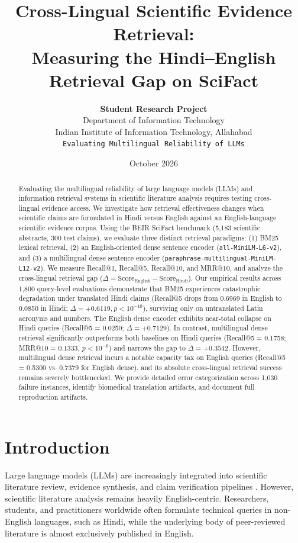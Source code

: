 \documentclass[11pt,a4paper]{article}
\title{\textbf{Cross-Lingual Scientific Evidence Retrieval:\\Measuring the Hindi--English Retrieval Gap on SciFact}}
\author{
  \textbf{Student Research Project} \\
  Department of Information Technology \\
  Indian Institute of Information Technology, Allahabad \\
  \texttt{Evaluating Multilingual Reliability of LLMs}
}
\date{October 2026}
\begin{document}
\maketitle

\begin{abstract}
Evaluating the multilingual reliability of large language models (LLMs) and information retrieval systems in scientific literature analysis requires testing cross-lingual evidence access. We investigate how retrieval effectiveness changes when scientific claims are formulated in Hindi versus English against an English-language scientific evidence corpus. Using the BEIR SciFact benchmark (5,183 scientific abstracts, 300 test claims), we evaluate three distinct retrieval paradigms: (1) BM25 lexical retrieval, (2) an English-oriented dense sentence encoder (\texttt{all-MiniLM-L6-v2}), and (3) a multilingual dense sentence encoder (\texttt{paraphrase-multilingual-MiniLM-L12-v2}). We measure Recall@1, Recall@5, Recall@10, and MRR@10, and analyze the cross-lingual retrieval gap ($\Delta = \text{Score}_{\text{English}} - \text{Score}_{\text{Hindi}}$). Our empirical results across 1,800 query-level evaluations demonstrate that BM25 experiences catastrophic degradation under translated Hindi claims (Recall@5 drops from 0.6969 in English to 0.0850 in Hindi; $\Delta = +0.6119, p < 10^{-10}$), surviving only on untranslated Latin acronyms and numbers. The English dense encoder exhibits near-total collapse on Hindi queries (Recall@5 = 0.0250; $\Delta = +0.7129$). In contrast, multilingual dense retrieval significantly outperforms both baselines on Hindi queries (Recall@5 = 0.1758; MRR@10 = 0.1333, $p < 10^{-6}$) and narrows the gap to $\Delta = +0.3542$. However, multilingual dense retrieval incurs a notable capacity tax on English queries (Recall@5 = 0.5300 vs. 0.7379 for English dense), and its absolute cross-lingual retrieval success remains severely bottlenecked. We provide detailed error categorization across 1,030 failure instances, identify biomedical translation artifacts, and document full reproduction artifacts.
\end{abstract}

\section{Introduction}
Large language models (LLMs) are increasingly integrated into scientific literature review, evidence synthesis, and claim verification pipelines \cite{wadden2020fact,thakur2021beir}. However, scientific literature analysis remains heavily English-centric. Researchers, students, and practitioners worldwide often formulate technical queries in non-English languages, such as Hindi, while the underlying body of peer-reviewed literature is almost exclusively published in English.
\end{document}

